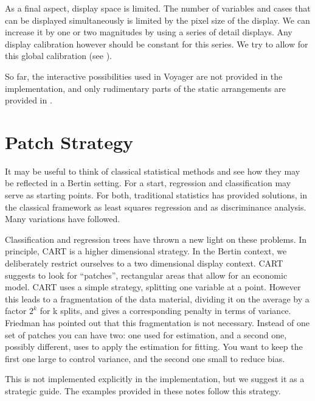 \documentclass[nogin, dvips,12pt,a4paper,twoside]{amsart}
\begin{document}
As a final aspect, display space is limited. The number of variables and cases that can be displayed simultaneously is limited by the pixel size of the display. We can increase it by one or two magnitudes by using a series of detail displays. Any display calibration however should be constant for this series. We try to allow for this global calibration (see ).


So far, the interactive possibilities used in Voyager \cite{Sawitzki1996Extensible-Stat} are not provided in the \R{} implementation, and only rudimentary parts of the static arrangements are provided in \R{}.

\section{Patch Strategy}
%

It may be useful to think of classical statistical methods and see how they may be reflected in a Bertin setting. For a start, regression and classification may serve as starting points. For both, traditional statistics has provided solutions, in the classical framework as least squares regression and as discriminance analysis. Many variations have followed.

Classification and regression trees \cite{Breiman1984CART} have thrown a new light on these problems. In principle, CART is a higher dimensional strategy. In the Bertin context, we deliberately restrict ourselves to a two dimensional display context. CART suggests to look for ``patches'', rectangular areas that allow for an economic model.  CART uses a simple strategy, splitting one variable at a point. However this leads to a fragmentation of the data material, dividing it on the average by a factor $2^k$ for k splits, and gives a corresponding penalty in terms of variance. Friedman \cite{Friedman1996LocalLearning} has pointed out that this fragmentation is not necessary. Instead of one set of patches you can have two: one used for estimation, and a second one, possibly different, uses to apply the estimation for fitting. You want to keep the first one large to control variance, and the second one small to reduce bias.

This is not implemented explicitly in the \R{} implementation, but we suggest it as a strategic guide. The examples provided in these notes follow this strategy.
\end{document}
